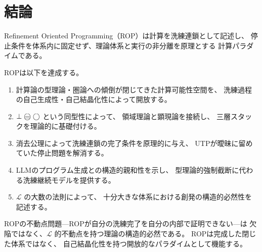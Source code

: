 \documentclass[11pt,a4paper]{ltjsarticle}
\theoremstyle{definition}
\newcommand{\Lhagma}{\mathcal{L}}
\begin{document}
\section{結論}

Refinement Oriented Programming（ROP）は計算を洗練連鎖として記述し、
停止条件を体系内に固定せず、理論体系と実行の非分離を原理とする
計算パラダイムである。

ROPは以下を達成する。

\begin{enumerate}
  \item 計算論の型理論・圏論への傾倒が閉じてきた計算可能性空間を、
    洗練過程の自己生成性・自己結晶化性によって開放する。
  
  \item $\bot \mweq \dfix$ という同型性によって、
    領域理論と顕現論を接続し、
    三層スタックを理論的に基礎付ける。
  
  \item 消去公理によって洗練連鎖の完了条件を原理的に与え、
    UTPが曖昧に留めていた停止問題を解消する。
  
  \item LLMのプログラム生成との構造的親和性を示し、
    型理論的強制截断に代わる洗練継続モデルを提供する。
  
  \item $\Lhagma$ の大数の法則によって、
    十分大きな体系における創発の構造的必然性を記述する。
\end{enumerate}

ROPの不動点問題---ROPが自分の洗練完了を自分の内部で証明できない---は
欠陥ではなく、$\Lhagma$ 的不動点を持つ理論の構造的必然である。
ROPは完成した閉じた体系ではなく、
自己結晶化性を持つ開放的なパラダイムとして機能する。
\end{document}
